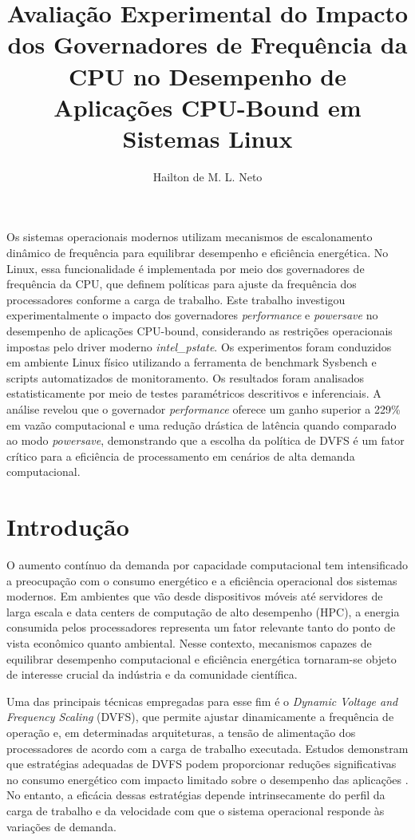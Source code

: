 \documentclass[12pt]{article}
\title{Avaliação Experimental do Impacto dos Governadores de Frequência da CPU no Desempenho de Aplicações CPU-Bound em Sistemas Linux}
\author{Hailton de M. L. Neto\inst{1}}
\begin{document}
 

\maketitle

\begin{resumo} 
  Os sistemas operacionais modernos utilizam mecanismos de escalonamento dinâmico de frequência para equilibrar desempenho e eficiência energética. No Linux, essa funcionalidade é implementada por meio dos governadores de frequência da CPU, que definem políticas para ajuste da frequência dos processadores conforme a carga de trabalho. Este trabalho investigou experimentalmente o impacto dos governadores \textit{performance} e \textit{powersave} no desempenho de aplicações CPU-bound, considerando as restrições operacionais impostas pelo driver moderno \textit{intel\_pstate}. Os experimentos foram conduzidos em ambiente Linux físico utilizando a ferramenta de benchmark Sysbench e scripts automatizados de monitoramento. Os resultados foram analisados estatisticamente por meio de testes paramétricos descritivos e inferenciais. A análise revelou que o governador \textit{performance} oferece um ganho superior a 229\% em vazão computacional e uma redução drástica de latência quando comparado ao modo \textit{powersave}, demonstrando que a escolha da política de DVFS é um fator crítico para a eficiência de processamento em cenários de alta demanda computacional.
\end{resumo}


\section{Introdução}

O aumento contínuo da demanda por capacidade computacional tem intensificado a preocupação com o consumo energético e a eficiência operacional dos sistemas modernos. Em ambientes que vão desde dispositivos móveis até servidores de larga escala e data centers de computação de alto desempenho (HPC), a energia consumida pelos processadores representa um fator relevante tanto do ponto de vista econômico quanto ambiental. Nesse contexto, mecanismos capazes de equilibrar desempenho computacional e eficiência energética tornaram-se objeto de interesse crucial da indústria e da comunidade científica.

Uma das principais técnicas empregadas para esse fim é o \textit{Dynamic Voltage and Frequency Scaling} (DVFS), que permite ajustar dinamicamente a frequência de operação e, em determinadas arquiteturas, a tensão de alimentação dos processadores de acordo com a carga de trabalho executada. Estudos demonstram que estratégias adequadas de DVFS podem proporcionar reduções significativas no consumo energético com impacto limitado sobre o desempenho das aplicações \cite{spiliopoulos2011, krzywda2018}. No entanto, a eficácia dessas estratégias depende intrinsecamente do perfil da carga de trabalho e da velocidade com que o sistema operacional responde às variações de demanda.
\end{document}
